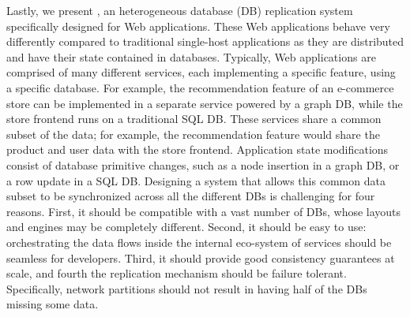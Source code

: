 Lastly, we present \synapse, an heterogeneous database (DB)
replication system specifically designed for Web applications. These Web
applications behave very differently compared to traditional single-host
applications as they are distributed and have their state contained in
databases. Typically, Web applications are comprised of many different
services, each implementing a specific feature, using a specific database.
For example, the recommendation feature of an e-commerce store can be
implemented in a separate service powered by a graph DB, while the store
frontend runs on a traditional SQL DB. These services share a common subset
of the data; for example, the recommendation feature would share the product
and user data with the store frontend.
Application state modifications consist of database primitive changes, such as a
node insertion in a graph DB, or a row update in a SQL DB. 
Designing a system that allows this common data subset to be synchronized across
all the different DBs is challenging for four reasons. First, it should be
compatible with a vast number of DBs, whose layouts and engines may be
completely different. Second, it should be easy to use: orchestrating the data
flows inside the internal eco-system of services should be seamless for developers.
Third, it should provide good consistency guarantees at scale, and fourth
the replication mechanism should be failure tolerant. Specifically, network partitions
should not result in having half of the DBs missing some data.

